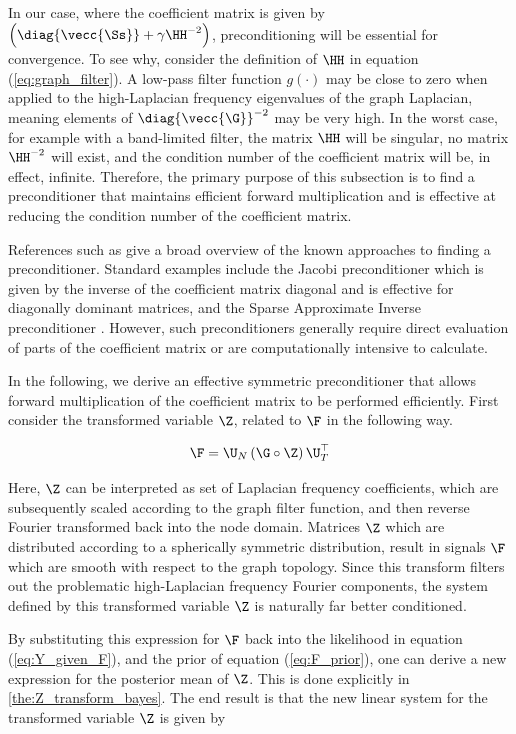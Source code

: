 In our case, where the coefficient matrix is given by $\Big(\diag{\vecc{\Ss}} + \gamma  \HH^{-2}\Big)$, preconditioning will be essential for convergence. To see why, consider the definition of $\HH$ in equation (\ref{eq:graph_filter}). A low-pass filter function $g(\cdot)$ may be close to zero when applied to the  high-Laplacian frequency eigenvalues of the graph Laplacian, meaning elements of $\diag{\vecc{\G}}^{-2}$ may be very high. In the worst case, for example with a band-limited filter, the matrix $\HH$ will be singular, no matrix $\HH^{-2}$ will exist, and the condition number of the coefficient matrix will be, in effect, infinite. Therefore, the primary purpose of this subsection is to find a preconditioner that maintains efficient forward multiplication and is effective at reducing the condition number of the coefficient matrix.

References such as \citep{Saad2003} give a broad overview of the known approaches to finding a preconditioner. Standard examples include the Jacobi preconditioner which is given by the inverse of the coefficient matrix diagonal and is effective for diagonally dominant matrices, and the Sparse Approximate Inverse preconditioner \citep{Grote1997}. However, such preconditioners generally require direct evaluation of parts of the coefficient matrix or are computationally intensive to calculate.

In the following, we derive an effective symmetric preconditioner that allows forward multiplication of the coefficient matrix to be performed efficiently. First consider the transformed variable $\Z$, related to $\F$ in the following way.

\begin{equation}
    \label{eq:Z_transform}
    \F = \U_N \, (\G \circ \Z) \, \U_T^\top
\end{equation}

Here, $\Z$ can be interpreted as set of Laplacian frequency coefficients, which are subsequently scaled according to the graph filter function, and then reverse Fourier transformed back into the node domain. Matrices $\Z$ which are distributed according to a spherically symmetric distribution, result in signals $\F$ which are smooth with respect to the graph topology. Since this transform filters out the problematic high-Laplacian frequency Fourier components, the system defined by this transformed variable $\Z$ is naturally far better conditioned.

By substituting this expression for $\F$ back into the likelihood in equation (\ref{eq:Y_given_F}), and the prior of equation (\ref{eq:F_prior}), one can derive a new expression for the posterior mean of $\Z$. This is done explicitly in \cref{the:Z_transform_bayes}. The end result is that the new linear system for the transformed variable $\Z$ is given by


